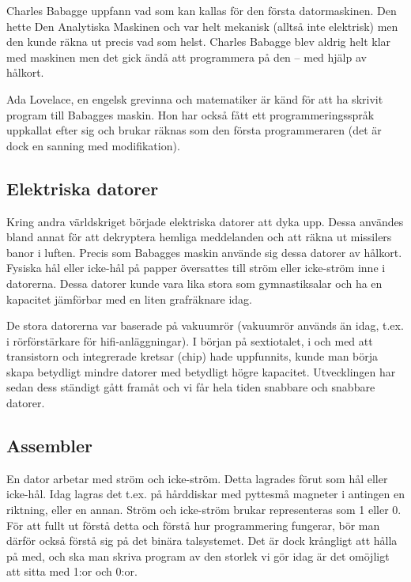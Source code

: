 
Charles Babagge uppfann vad som kan kallas för den första datormaskinen. Den hette Den Analytiska Maskinen och var helt mekanisk (alltså inte elektrisk) men den kunde räkna ut precis vad som helst. Charles Babagge blev aldrig helt klar med maskinen men det gick ändå att programmera på den – med hjälp av hålkort.


Ada Lovelace, en engelsk grevinna och matematiker är känd för att ha skrivit program till Babagges maskin. Hon har också fått ett programmeringsspråk uppkallat efter sig och brukar räknas som den första programmeraren (det är dock en sanning med modifikation).

\subsection{Elektriska datorer}
Kring andra världskriget började elektriska datorer att dyka upp. Dessa användes bland annat för att dekryptera hemliga meddelanden och att räkna ut missilers banor i luften. Precis som Babagges maskin använde sig dessa datorer av hålkort. Fysiska hål eller icke-hål på papper översattes till ström eller icke-ström inne i datorerna. Dessa datorer kunde vara lika stora som gymnastiksalar och ha en kapacitet jämförbar med en liten grafräknare idag.

De stora datorerna var baserade på vakuumrör (vakuumrör används än idag, t.ex. i rörförstärkare för hifi-anläggningar). I början på sextiotalet, i och med att transistorn och integrerade kretsar (chip) hade uppfunnits, kunde man börja skapa betydligt mindre datorer med betydligt högre kapacitet. Utvecklingen har sedan dess ständigt gått framåt och vi får hela tiden snabbare och snabbare datorer.


\subsection{Assembler}
En dator arbetar med ström och icke-ström. Detta lagrades förut som hål eller icke-hål. Idag lagras det t.ex. på hårddiskar med pyttesmå magneter i antingen en riktning, eller en annan. Ström och icke-ström brukar representeras som 1 eller 0. För att fullt ut förstå detta och förstå hur programmering fungerar, bör man därför också förstå sig på det binära talsystemet. Det är dock krångligt att hålla på med, och ska man skriva program av den storlek vi gör idag är det omöjligt att sitta med 1:or och 0:or.

